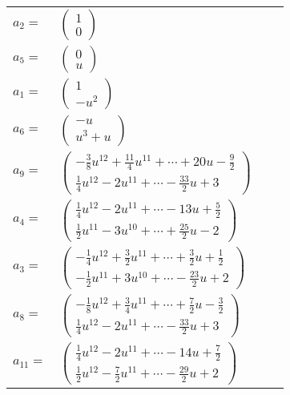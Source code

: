 \documentclass[1p]{elsarticle_modified}
\theoremstyle{definition}
\begin{document}
\begin{tabular}{m{7pt} m{180pt} m{7pt} m{180pt} }
\flushright $a_{2}=$&$\begin{pmatrix}1\\0\end{pmatrix}$ \\
\flushright $a_{5}=$&$\begin{pmatrix}0\\u\end{pmatrix}$ \\
\flushright $a_{1}=$&$\begin{pmatrix}1\\- u^2\end{pmatrix}$ \\
\flushright $a_{6}=$&$\begin{pmatrix}- u\\u^3+u\end{pmatrix}$ \\
\flushright $a_{9}=$&$\begin{pmatrix}-\frac{3}{8} u^{12}+\frac{11}{4} u^{11}+\cdots+20 u-\frac{9}{2}\\\frac{1}{4} u^{12}-2 u^{11}+\cdots-\frac{33}{2} u+3\end{pmatrix}$ \\
\flushright $a_{4}=$&$\begin{pmatrix}\frac{1}{4} u^{12}-2 u^{11}+\cdots-13 u+\frac{5}{2}\\\frac{1}{2} u^{11}-3 u^{10}+\cdots+\frac{25}{2} u-2\end{pmatrix}$ \\
\flushright $a_{3}=$&$\begin{pmatrix}-\frac{1}{4} u^{12}+\frac{3}{2} u^{11}+\cdots+\frac{3}{2} u+\frac{1}{2}\\-\frac{1}{2} u^{11}+3 u^{10}+\cdots-\frac{23}{2} u+2\end{pmatrix}$ \\
\flushright $a_{8}=$&$\begin{pmatrix}-\frac{1}{8} u^{12}+\frac{3}{4} u^{11}+\cdots+\frac{7}{2} u-\frac{3}{2}\\\frac{1}{4} u^{12}-2 u^{11}+\cdots-\frac{33}{2} u+3\end{pmatrix}$ \\
\flushright $a_{11}=$&$\begin{pmatrix}\frac{1}{4} u^{12}-2 u^{11}+\cdots-14 u+\frac{7}{2}\\\frac{1}{2} u^{12}-\frac{7}{2} u^{11}+\cdots-\frac{29}{2} u+2\end{pmatrix}$ \\

\end{tabular}
\end{document}
